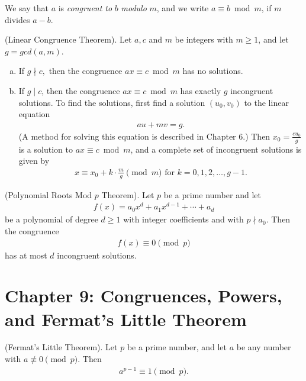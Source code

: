\documentclass[graybox]{svmult}
\begin{document}
\begin{definition}
We say that $a$ is \textit{congruent to} $b$ \textit{modulo} $m$, and we write $a \equiv b\bmod m$, if $m$ divides $a-b$.
\end{definition}

\begin{theorem}
(Linear Congruence Theorem). Let $a,c$ and $m$ be integers with $m\geqslant 1$, and let $g=gcd(a,m)$.
\begin{enumerate}[(a)]
\item If $g \nmid c,$ then the congruence $ax \equiv c \bmod m$ has no solutions.
\item If $g \mid c$, then the congruence $ax \equiv c \bmod m$ has exactly $g$ incongruent solutions. To find the solutions, first find a solution $(u_0, v_0)$ to the linear equation
\begin{align*}
au+mv=g.
\end{align*}
(A method for solving this equation is described in Chapter 6.) Then $x_0 = \frac{cu_0}{g}$ is a solution to $ax \equiv c \bmod m$, and a complete set of incongruent solutions is given by
\begin{align*}
x \equiv x_0 + k \cdot \frac{m}{g} \pmod m \text{ for } k = 0,1,2,\ldots,g-1.
\end{align*}
\end{enumerate}
\end{theorem}

\begin{theorem}
(Polynomial Roots Mod $p$ Theorem). Let $p$ be a prime number and let
\begin{align*}
f(x) = a_0x^d+a_1x^{d-1}+\cdots+a_d
\end{align*}
be a polynomial of degree $d \geqslant 1$ with integer coefficients and with $p \nmid a_0$. Then the congruence
\begin{align*}
f(x) \equiv 0 \pmod p
\end{align*}
has at most $d$ incongruent solutions.
\end{theorem}

\section*{Chapter 9: Congruences, Powers, and Fermat's Little Theorem}

\begin{svgraybox}
\begin{theorem}
(Fermat's Little Theorem). Let $p$ be a prime number, and let $a$ be any number with $a \not \equiv 0 \pmod p$. Then
\begin{align*}
a^{p-1} \equiv 1 \pmod p.
\end{align*}
\end{theorem}
\end{svgraybox}
\end{document}
